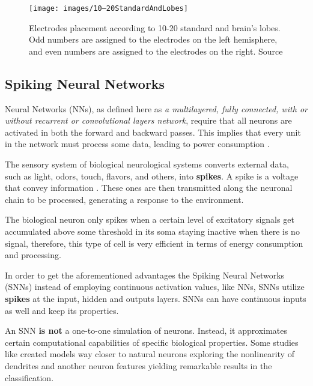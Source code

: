 		\begin{figure}[h]
			\centering
			\texttt{[image: images/10–20StandardAndLobes]}
			\caption[10-20 standard and brain lobes]{Electrodes placement according to 10-20 standard \cite{sistema10-20} and brain's lobes. Odd numbers are assigned to the electrodes on the left hemisphere, and even numbers are assigned to the electrodes on the right. Source \cite{JALALYBIDGOLY2020101788}}
			\label{fig:1020standardandlobes}
		\end{figure}
	
	\subsection{Spiking Neural Networks}
	
		\par Neural Networks (NNs), as defined here as \textit{a multilayered, fully connected, with or without recurrent or convolutional layers network}, require that all neurons are activated in both the forward and backward passes. This implies that every unit in the network must process some data, leading to power consumption \cite{10242251}. 

		\par The sensory system of biological neurological systems converts external data, such as light, odors, touch, flavors, and others, into \textbf{spikes}. A spike is a voltage that convey information \cite{kasabov2019time}. These ones are then transmitted along the neuronal chain to be processed, generating a response to the environment.
		
		\par The biological neuron only spikes when a certain level of excitatory signals get accumulated above some threshold in its soma staying inactive when there is no signal, therefore, this type of cell is very efficient in terms of energy consumption and processing.
		
		\par In order to get the aforementioned advantages the Spiking Neural Networks (SNNs) instead of employing continuous activation values, like NNs, SNNs utilize \textbf{spikes} at the input, hidden and outputs layers. SNNs can have continuous inputs as well and keep its properties.
		
		
		\par An SNN \textbf{is not} a one-to-one simulation of neurons. Instead, it approximates certain computational capabilities of specific biological properties. Some studies like \cite{jones2020single} created models way closer to natural neurons exploring the nonlinearity of dendrites and another neuron features yielding remarkable results in the classification.
		
